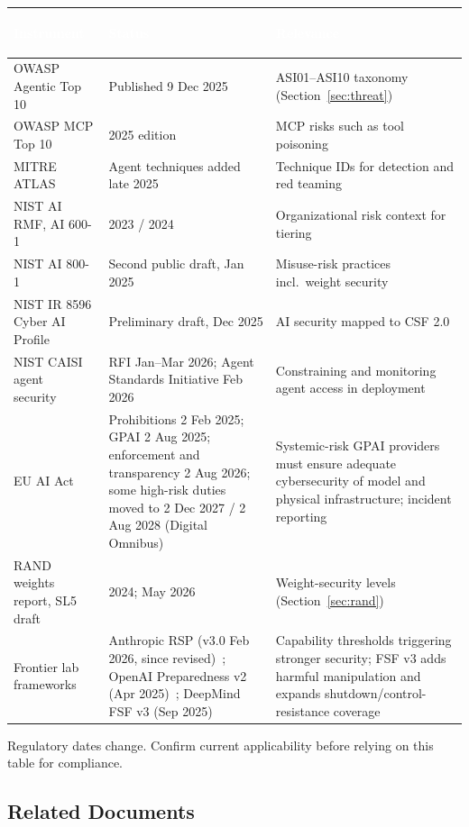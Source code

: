 \documentclass[11pt,letterpaper]{article}
\newcommand{\hrow}{\rowcolor{slategraphite}}
\newcommand{\hdr}[1]{\textcolor{white}{\bfseries\strut #1}}
\begin{document}
\begin{longtable}{L{4.4cm} L{4.6cm} L{7.0cm}}
\hrow \hdr{Instrument} & \hdr{Status} & \hdr{Relevance} \\
\endhead
OWASP Agentic Top 10~\cite{owaspasi} & Published 9 Dec 2025 & ASI01--ASI10 taxonomy (Section~\ref{sec:threat}) \\
OWASP MCP Top 10~\cite{owaspmcp} & 2025 edition & MCP risks such as tool poisoning \\
MITRE ATLAS~\cite{atlas} & Agent techniques added late 2025 & Technique IDs for detection and red teaming \\
NIST AI RMF, AI 600-1 & 2023 / 2024 & Organizational risk context for tiering \\
NIST AI 800-1~\cite{nist8001} & Second public draft, Jan 2025 & Misuse-risk practices incl.\ weight security \\
NIST IR 8596 Cyber AI Profile~\cite{nist8596} & Preliminary draft, Dec 2025 & AI security mapped to CSF 2.0 \\
NIST CAISI agent security~\cite{caisi} & RFI Jan--Mar 2026; Agent Standards Initiative Feb 2026 & Constraining and monitoring agent access in deployment \\
EU AI Act~\cite{euaiact} & Prohibitions 2 Feb 2025; GPAI 2 Aug 2025; enforcement and transparency 2 Aug 2026; some high-risk duties moved to 2 Dec 2027 / 2 Aug 2028 (Digital Omnibus) & Systemic-risk GPAI providers must ensure adequate cybersecurity of model and physical infrastructure; incident reporting \\
RAND weights report, SL5 draft~\cite{rand,sl5} & 2024; May 2026 & Weight-security levels (Section~\ref{sec:rand}) \\
Frontier lab frameworks & Anthropic RSP (v3.0 Feb 2026, since revised)~\cite{asl3}; OpenAI Preparedness v2 (Apr 2025)~\cite{preparedness}; DeepMind FSF v3 (Sep 2025)~\cite{fsf} & Capability thresholds triggering stronger security; FSF v3 adds harmful manipulation and expands shutdown/control-resistance coverage \\*
\bottomrule
\end{longtable}

\begin{hardwarebox}
Regulatory dates change. Confirm current applicability before relying on this table for compliance.
\end{hardwarebox}

\subsection{Related Documents}
\end{document}
